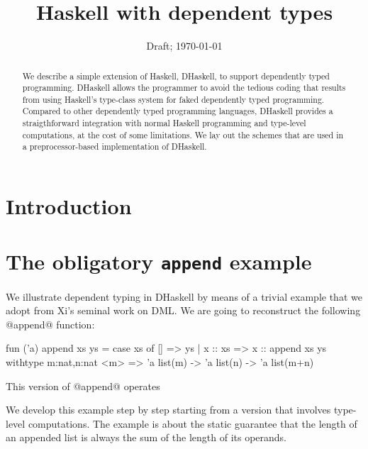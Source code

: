 \documentclass{article}
\begin{document}
 
\title{Haskell with dependent types}
 

\date{Draft; \today}

\maketitle

\begin{abstract}

We describe a simple extension of Haskell, DHaskell, to support
dependently typed programming. DHaskell allows the programmer to avoid
the tedious coding that results from using Haskell's type-class system
for faked dependently typed programming. Compared to other dependently
typed programming languages, DHaskell provides a straigthforward
integration with normal Haskell programming and type-level
computations, at the cost of some limitations. We lay out the schemes
that are used in a preprocessor-based implementation of DHaskell.
\end{abstract}

\makeatactive
 


\section{Introduction}



\section{The obligatory \texttt{append} example}

We illustrate dependent typing in DHaskell by means of a trivial
example that we adopt from Xi's seminal work on DML. We are going to
reconstruct the following @append@ function:

\begin{code}
 fun ('a) append xs ys =
  case xs of [] => ys | x :: xs => x :: append xs ys
 withtype {m:nat,n:nat} <m> =>
         'a list(m) -> 'a list(n) -> 'a list(m+n)
\end{code}

This version of @append@ operates 

We develop this
example step by step starting from a version that involves type-level
computations. The example is about the static guarantee that the
length of an appended list is always the sum of the length of its
operands.
\end{document}
